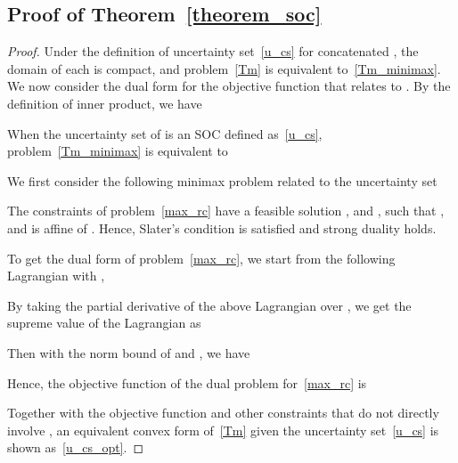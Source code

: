 \documentclass[10pt,twocolumn,twoside,english]{IEEEtran}
\begin{document}
\subsection{Proof of Theorem~\ref{theorem_soc}}
\label{appendix_soc}
\begin{proof}
Under the definition of uncertainty set~\eqref{u_cs} for concatenated , the domain of each  is compact, and problem~\eqref{Tm} is equivalent to~\eqref{Tm_minimax}. We now consider the dual form for the objective function  that relates to . By the definition of inner product, we have

When the uncertainty set of  is an SOC defined as~\eqref{u_cs}, problem~\eqref{Tm_minimax} is equivalent to



We first consider the following minimax problem related to the uncertainty set 

The constraints of problem~\eqref{max_rc} have a feasible solution ,  and , such that , and  is affine of . Hence, Slater's condition is satisfied and strong duality holds.

To get the dual form of problem~\eqref{max_rc}, we start from the following Lagrangian with ,

By taking the partial derivative of the above Lagrangian over , we get the supreme value of the Lagrangian as

Then with the norm bound of  and , we have
 
Hence, the objective function of the dual problem for~\eqref{max_rc} is

Together with the objective function  and other constraints that do not directly involve , an equivalent convex form of~\eqref{Tm} given the uncertainty set~\eqref{u_cs} is shown as~\eqref{u_cs_opt}.
\end{proof} 
\end{document}
